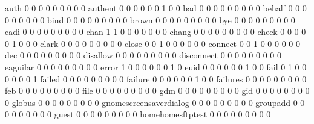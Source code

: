 \documentclass[compress,8pt]{beamer}
\begin{document}
\begin{frame}
\begin{Schunk}
  auth                                       0   0   0   0   0   0   0   0   0
  authent                                    0   0   0   0   0   0   1   0   0
  bad                                        0   0   0   0   0   0   0   0   0
  behalf                                     0   0   0   0   0   0   0   0   0
  bind                                       0   0   0   0   0   0   0   0   0
  brown                                      0   0   0   0   0   0   0   0   0
  bye                                        0   0   0   0   0   0   0   0   0
  cadi                                       0   0   0   0   0   0   0   0   0
  chan                                       1   1   0   0   0   0   0   0   0
  chang                                      0   0   0   0   0   0   0   0   0
  check                                      0   0   0   0   0   1   0   0   0
  clark                                      0   0   0   0   0   0   0   0   0
  close                                      0   0   1   0   0   0   0   0   0
  connect                                    0   0   1   0   0   0   0   0   0
  dec                                        0   0   0   0   0   0   0   0   0
  disallow                                   0   0   0   0   0   0   0   0   0
  disconnect                                 0   0   0   0   0   0   0   0   0
  eaguilar                                   0   0   0   0   0   0   0   0   0
  error                                      1   0   0   0   0   0   0   1   0
  euid                                       0   0   0   0   0   0   1   0   0
  fail                                       0   1   0   0   0   0   0   0   1
  failed                                     0   0   0   0   0   0   0   0   0
  failure                                    0   0   0   0   0   0   1   0   0
  failures                                   0   0   0   0   0   0   0   0   0
  feb                                        0   0   0   0   0   0   0   0   0
  file                                       0   0   0   0   0   0   0   0   0
  gdm                                        0   0   0   0   0   0   0   0   0
  gid                                        0   0   0   0   0   0   0   0   0
  globus                                     0   0   0   0   0   0   0   0   0
  gnomescreensaverdialog                     0   0   0   0   0   0   0   0   0
  groupadd                                   0   0   0   0   0   0   0   0   0
  guest                                      0   0   0   0   0   0   0   0   0
  homehomesftptest                           0   0   0   0   0   0   0   0   0

\end{Schunk}
\end{frame}
\end{document}
